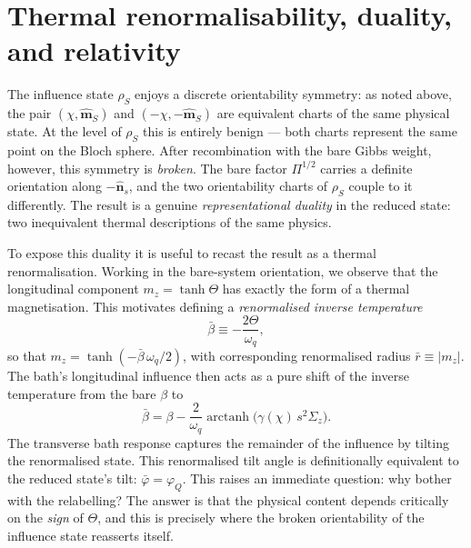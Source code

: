 \section{Thermal renormalisability, duality, and relativity}
\label{subsec:qubit_v3_theta_duality}

The influence state \(\rho_S\) enjoys a discrete orientability symmetry: as noted above, the pair
\((\chi,\hat{\mathbf{m}}_S)\) and \((-\chi,-\hat{\mathbf{m}}_S)\) are equivalent charts of the
same physical state. At the level of \(\rho_S\) this is entirely benign — both charts represent
the same point on the Bloch sphere. After recombination with the bare Gibbs weight, however, this
symmetry is \emph{broken}. The bare factor \(\Pi^{1/2}\) carries a definite orientation along
\(-\hat{\mathbf{n}}_s\), and the two orientability charts of \(\rho_S\) couple to it differently.
The result is a genuine \emph{representational duality} in the reduced state: two inequivalent
thermal descriptions of the same physics.

To expose this duality it is useful to recast the result as a thermal renormalisation. Working in
the bare-system orientation, we observe that the longitudinal component \(m_z = \tanh\Theta\) has
exactly the form of a thermal magnetisation. This motivates defining a \emph{renormalised inverse
temperature}
\begin{equation}
    \bar\beta \equiv -\frac{2\Theta}{\omega_q},
    \label{eq:bar_beta_def}
\end{equation}
so that \(m_z = \tanh(-\bar\beta\,\omega_q/2)\), with corresponding renormalised radius
\(\bar r \equiv |m_z|\). The bath's longitudinal influence then acts as a pure shift of the inverse
temperature from the bare \(\beta\) to
\begin{equation}
    \bar\beta = \beta - \frac{2}{\omega_q}\operatorname{arctanh}\!\big(\gamma(\chi)\,s^2\Sigma_z\big).
    \label{eq:bar_beta_explicit}
\end{equation}
The transverse bath response captures the remainder of the influence by tilting the renormalised
state. This renormalised tilt angle is definitionally equivalent to the reduced state's tilt: \(\bar\varphi = \varphi_Q\). This raises an immediate question: why bother with the relabelling? The answer is that the physical
content depends critically on the \emph{sign} of \(\Theta\), and this is precisely where the
broken orientability of the influence state reasserts itself. 


